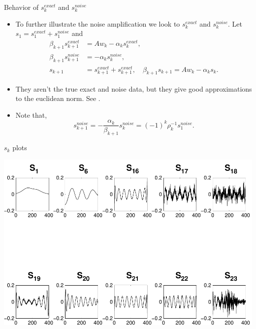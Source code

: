 \documentclass{beamer}
\begin{document}
\begin{frame}{Behavior of $s_{k}^{exact}$ and $s_{k}^{noise}$}
  \begin{itemize}
    \item To further illustrate the noise amplification we look to
      $s_{k}^{exact}$ and $s_{k}^{noise}$. Let $s_{1} = s_{1}^{exact} + 
      s_{1}^{noise}$ and
      \begin{align*}
	\beta_{k+1}s_{k+1}^{exact} &= Aw_{k} - \alpha_{k}s_{k}^{exact}, \\
	\beta_{k+1}s_{k+1}^{noise} &= -\alpha_{k}s_{k}^{noise}, \\
	s_{k+1} &= s_{k+1}^{exact} + s_{k+1}^{exact}, \quad 
	\beta_{k+1}s_{k+1} = Aw_{k} - \alpha_{k}s_{k}.
      \end{align*}
      
    \item They aren't the true exact and noise data, but they give good
      approximations to the euclidean norm. See \cite{bidiagonalization}.

    \item Note that,
      \begin{equation*}
	s_{k+1}^{noise} = -\frac{\alpha_{k}}{\beta_{k+1}}s_{k}^{noise} =
	(-1)^{k}\rho_{k}^{-1}s_{1}^{noise}.
      \end{equation*}
  \end{itemize}
\end{frame}

\begin{frame}{$s_{k}$ plots}
  \begin{center}
    \includegraphics[width=0.55\linewidth]{figures/run1/sk_plots}
  \end{center}
\end{frame}
\end{document}
